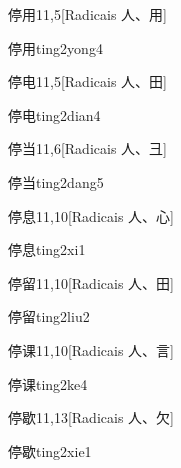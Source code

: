 \begin{entry}{停用}{11,5}[Radicais ⼈、⽤]
  \begin{phonetics}{停用}{ting2yong4}
  \end{phonetics}
\end{entry}

\begin{entry}{停电}{11,5}[Radicais ⼈、⽥]
  \begin{phonetics}{停电}{ting2dian4}
  \end{phonetics}
\end{entry}

\begin{entry}{停当}{11,6}[Radicais ⼈、⼹]
  \begin{phonetics}{停当}{ting2dang5}
  \end{phonetics}
\end{entry}

\begin{entry}{停息}{11,10}[Radicais ⼈、⼼]
  \begin{phonetics}{停息}{ting2xi1}
  \end{phonetics}
\end{entry}

\begin{entry}{停留}{11,10}[Radicais ⼈、⽥]
  \begin{phonetics}{停留}{ting2liu2}
  \end{phonetics}
\end{entry}

\begin{entry}{停课}{11,10}[Radicais ⼈、⾔]
  \begin{phonetics}{停课}{ting2ke4}
  \end{phonetics}
\end{entry}

\begin{entry}{停歇}{11,13}[Radicais ⼈、⽋]
  \begin{phonetics}{停歇}{ting2xie1}
  \end{phonetics}
\end{entry}

